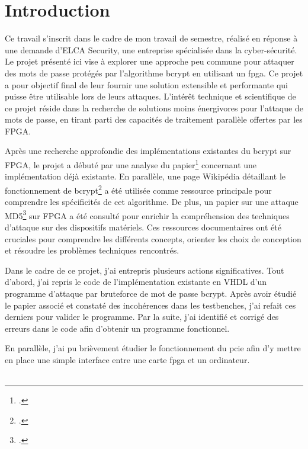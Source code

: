 \chapter*{Introduction}


Ce travail s'inscrit dans le cadre de mon travail de semestre, réalisé en réponse à une demande d'ELCA Security, une entreprise spécialisée dans la cyber-sécurité. Le projet présenté ici vise à explorer une approche peu commune pour attaquer des mots de passe protégés par l'algorithme bcrypt en utilisant un \gls{fpga}. Ce projet a pour objectif final de leur fournir une solution extensible et performante qui puisse être utilisable lors de leurs attaques. L'intérêt technique et scientifique de ce projet réside dans la recherche de solutions moins énergivores  pour l'attaque de mots de passe, en tirant parti des capacités de traitement parallèle offertes par les FPGA.


Après une recherche approfondie des implémentations existantes du bcrypt sur FPGA, le projet a débuté par une analyse du papier\footcite{wiemer_high-speed_2014} concernant une implémentation déjà existante. En parallèle, une page Wikipédia détaillant le fonctionnement de bcrypt\footcite{noauthor_bcrypt_2024} a été utilisée comme ressource principale pour comprendre les spécificités de cet algorithme. De plus, un papier sur une attaque MD5\footcite{gillela_parallelization_2019} sur FPGA a été consulté pour enrichir la compréhension des techniques d'attaque sur des dispositifs matériels. Ces ressources documentaires ont été cruciales pour comprendre les différents concepts, orienter les choix de conception et résoudre les problèmes techniques rencontrés.

Dans le cadre de ce projet, j'ai entrepris plusieurs actions significatives. Tout d'abord, j'ai repris le code de l'implémentation existante en VHDL d'un programme d'attaque par bruteforce de mot de passe bcrypt. Après avoir étudié le papier associé et constaté des incohérences dans les testbenches, j'ai refait ces derniers pour valider le programme. Par la suite, j'ai identifié et corrigé des erreurs dans le code afin d'obtenir un programme fonctionnel.

En parallèle, j'ai pu brièvement étudier le fonctionnement du \gls{pcie} afin d'y mettre en place une simple interface entre une carte \gls{fpga} et un ordinateur.\\\

